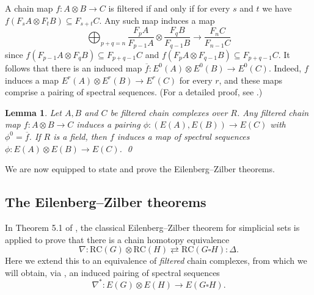 \documentclass[a4paper, 11 pt, oneside, reqno]{amsart}
\newtheorem{lemma}{Lemma}
\numberwithin{lemma}{section}
\theoremstyle{definition}
\newcommand{\bpc}{\mathrm{RC}}
\newcommand{\MPSS}{E}
\begin{document}
A chain map \(f\colon A \otimes B \to C\) is filtered if and only if for every \(s\) and \(t\) we have \(f(F_sA \otimes F_tB) \subseteq F_{s+t}C\). Any such map induces a map
\[\bigoplus_{p+q=n} \frac{F_p A}{F_{p-1} A} \otimes \frac{F_q B}{F_{q-1} B} \to \frac{F_{n} C}{F_{n-1} C}\]
since \(f(F_{p-1}A \otimes F_q B) \subseteq F_{p+q-1} C\) and  \(f(F_{p}A \otimes F_{q-1} B) \subseteq F_{p+q-1} C \). It follows that there is an induced map \(\overline{f}\colon E^0(A) \otimes E^0(B) \to E^0(C)\). Indeed, \(f\) induces a map \(E^r(A) \otimes E^r(B) \to E^r(C)\) for every \(r\), and these maps comprise a pairing of spectral sequences. (For a detailed proof, see \cite[Lemma 3.5.2]{Helle}.)

\begin{lemma}\label{lem:helle}
Let \(A,B\) and \(C\) be filtered chain complexes over \(R\). Any filtered chain map \(f\colon A \otimes B \to C\) induces a pairing \(\phi\colon (E(A), E(B)) \to E(C)\) with \(\phi^0 = \overline{f}\). If \(R\) is a field, then \(f\) induces a map of spectral sequences \(\phi\colon E(A) \otimes E(B) \to E(C)\).
\qed
\end{lemma}

We are now equipped to state and prove the Eilenberg--Zilber theorems.

\subsection{The Eilenberg--Zilber theorems}
\label{sec:EZ_proofs}

In Theorem 5.1 of \cite{HepworthRoff2023}, 
the classical Eilenberg--Zilber theorem for simplicial sets is applied to prove 
that there is a chain homotopy equivalence
\[\nabla\colon \bpc(G) \otimes \bpc(H) \rightleftarrows \bpc(G \square H): \Delta.\]
Here we extend this to an equivalence of 
\emph{filtered} chain complexes, from which we will obtain, via , an induced pairing of spectral sequences
\[\nabla^\ast\colon \MPSS(G) \otimes \MPSS(H) \to \MPSS(G \square H).\]
\end{document}

